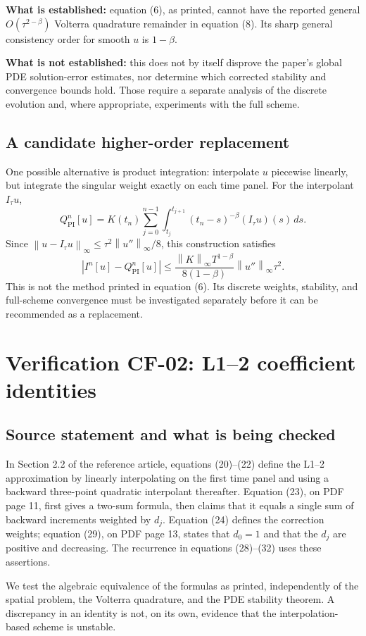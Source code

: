 \documentclass[11pt]{amsart}
\numberwithin{equation}{section}
\theoremstyle{remark}
\newcommand{\norm}[1]{\left\lVert #1\right\rVert}
\newcommand{\abs}[1]{\left\lvert #1\right\rvert}
\begin{document}
\textbf{What is established:} equation (6), as printed, cannot have the
reported general $O(\tau^{2-\beta})$ Volterra quadrature remainder in equation
(8). Its sharp general consistency order for smooth $u$ is $1-\beta$.

\textbf{What is not established:} this does not by itself disprove the paper's
global PDE solution-error estimates, nor determine which corrected stability
and convergence bounds hold. Those require a separate analysis of the
discrete evolution and, where appropriate, experiments with the full scheme.

\subsection{A candidate higher-order replacement}
One possible alternative is product integration: interpolate $u$ piecewise
linearly, but integrate the singular weight exactly on each time panel. For
the interpolant $I_\tau u$,
\[
Q_{\mathrm{PI}}^n[u]=K(t_n)\sum_{j=0}^{n-1}
\int_{t_j}^{t_{j+1}}(t_n-s)^{-\beta}(I_\tau u)(s)\,ds.
\]
Since $\norm{u-I_\tau u}_\infty\leq\tau^2\norm{u''}_\infty/8$, this
construction satisfies
\[
\abs{I^n[u]-Q_{\mathrm{PI}}^n[u]}
\leq\frac{\norm{K}_\infty T^{1-\beta}}{8(1-\beta)}
\norm{u''}_\infty\tau^2.
\]
This is not the method printed in equation (6). Its discrete weights,
stability, and full-scheme convergence must be investigated separately before
it can be recommended as a replacement.

\section{Verification CF-02: L1--2 coefficient identities}\label{sec:cf}
\subsection{Source statement and what is being checked}
In Section 2.2 of the reference article, equations (20)--(22) define the
L1--2 approximation by linearly interpolating on the first time panel and
using a backward three-point quadratic interpolant thereafter. Equation (23),
on PDF page 11, first gives a two-sum formula, then claims that it equals a
single sum of backward increments weighted by $d_j$. Equation (24) defines
the correction weights; equation (29), on PDF page 13, states that $d_0=1$
and that the $d_j$ are positive and decreasing. The recurrence in equations
(28)--(32) uses these assertions.

We test the algebraic equivalence of the formulas as printed, independently
of the spatial problem, the Volterra quadrature, and the PDE stability
theorem. A discrepancy in an identity is not, on its own, evidence that the
interpolation-based scheme is unstable.
\end{document}
